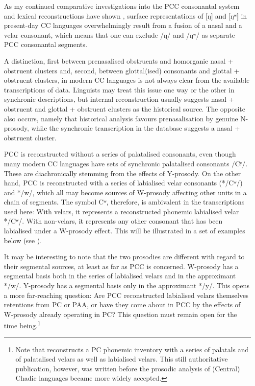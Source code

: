 \documentclass[output=paper]{langscibook}
\begin{document}
As my continued comparative investigations into the PCC consonantal system and lexical reconstructions have shown \citep{Wolffinpressb}, surface representations of [ŋ] and [ŋʷ] in present-day CC languages overwhelmingly result from a fusion of a nasal and a velar consonant, which means that one can exclude /ŋ/ and /ŋʷ/ as separate PCC consonantal segments. 

A distinction, first between prenasalised obstruents and homorganic nasal + obstruent clusters and, second, between glottal(ised) consonants and glottal + obstruent clusters, in modern CC languages is not always clear from the available transcriptions of data. Linguists may treat this issue one way or the other in synchronic descriptions, but internal reconstruction usually suggests nasal + obstruent and glottal + obstruent clusters as the historical source. The opposite also occurs, namely that historical analysis favours prenasalisation by genuine N-prosody, while the synchronic transcription in the database suggests a nasal + obstruent cluster.

PCC is reconstructed without a series of palatalised consonants, even though many modern CC languages have sets of synchronic palatalised consonants /Cʸ/. These are diachronically stemming from the effects of Y-prosody. On the other hand, PCC is reconstructed with a series of labialised velar consonants (*/Cʷ/) and */w/, which all may become sources of W-prosody affecting other units in a chain of segments. The symbol Cʷ, therefore, is ambivalent in the transcriptions used here: With velars, it represents a reconstructed phonemic labialised velar \mbox{*/Cʷ/}. With non-velars, it represents any other consonant that has been labialised under a W-prosody effect. This will be illustrated in a set of examples below (see ).

It may be interesting to note that the two prosodies are different with regard to their segmental sources, at least as far as PCC is concerned. W-prosody has a segmental basis both in the series of labialised velars and in the approximant \mbox{*/w/}. Y-prosody has a segmental basis only in the approximant */y/. This opens a more far-reaching question: Are PCC reconstructed labialised velars themselves retentions from PC or PAA, or have they come about in PCC by the effects of W-prosody already operating in PC? This question must remain open for the time being.\footnote{Note that \citet[9]{Newman1977} reconstructs a PC phonemic inventory with a series of palatals and of palatalised velars as well as labialised velars. This still authoritative publication, however, was written before the prosodic analysis of (Central) Chadic languages became more widely accepted.} 
\end{document}
